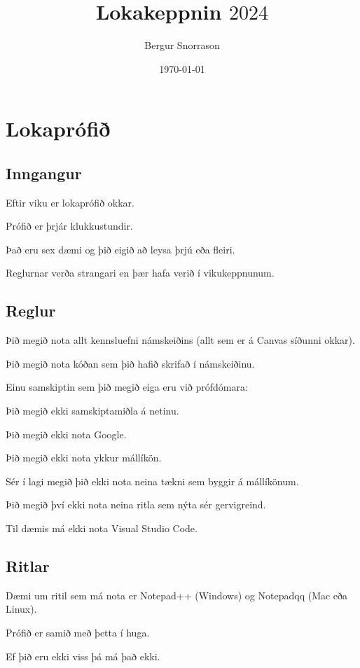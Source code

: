 \title{Lokakeppnin $2024$}
\author{Bergur Snorrason}
\date{\today}



\frame{\titlepage}

\section{Lokaprófið}
\subsection{Inngangur}
{
    {
        \item<1-> Eftir viku er lokaprófið okkar.
        \item<2-> Prófið er þrjár klukkustundir.
        \item<3-> Það eru sex dæmi og þið eigið að leysa þrjú eða fleiri.
        \item<4-> Reglurnar verða strangari en þær hafa verið í vikukeppnunum.
    }
}

\subsection{Reglur}
{
    {
        \item<1-> Þið megið nota allt kennsluefni námskeiðins (allt sem er á Canvas síðunni okkar).
        \item<2-> Þið megið nota kóðan sem þið hafið skrifað í námskeiðinu.
        \item<3-> Einu samskiptin sem þið megið eiga eru við prófdómara:
        {
            \item<4-> Þið megið ekki samskiptamiðla á netinu.
            \item<5-> Þið megið ekki nota Google.
            \item<6-> Þið megið ekki nota ykkur mállíkön.
        }
        \item<7-> Sér í lagi megið þið ekki nota neina tækni sem byggir á mállíkönum.
        \item<8-> Þið megið því ekki nota neina ritla sem nýta sér gervigreind.
        \item<9-> Til dæmis má ekki nota Visual Studio Code.
    }
}

\subsection{Ritlar}
{
    {
    \item<1-> Dæmi um ritil sem má nota er Notepad++ (Windows) og Notepadqq (Mac eða Linux).
        \item<2-> Prófið er samið með þetta í huga.
        \item<3-> Ef þið eru ekki viss þá má það ekki.
    }
}

